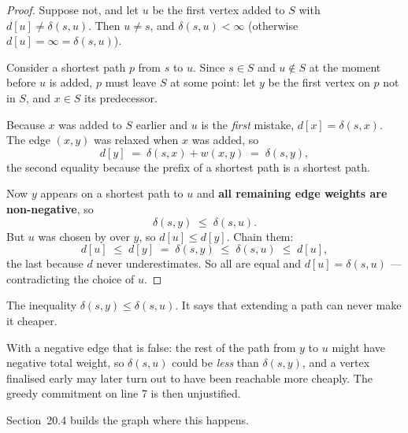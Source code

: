 \begin{proof}
Suppose not, and let $u$ be the first vertex added to $S$ with
$d[u] \ne \delta(s,u)$. Then $u \ne s$, and $\delta(s,u) < \infty$ (otherwise
$d[u] = \infty = \delta(s,u)$).

\smallskip
Consider a shortest path $p$ from $s$ to $u$. Since $s \in S$ and $u \notin S$
at the moment before $u$ is added, $p$ must leave $S$ at some point: let $y$ be
the first vertex on $p$ not in $S$, and $x \in S$ its predecessor.

\smallskip
Because $x$ was added to $S$ earlier and $u$ is the \emph{first} mistake,
$d[x] = \delta(s,x)$. The edge $(x,y)$ was relaxed when $x$ was added, so
\[ d[y] \;=\; \delta(s,x) + w(x,y) \;=\; \delta(s,y), \]
the second equality because the prefix of a shortest path is a shortest path.

\smallskip
Now $y$ appears on a shortest path to $u$ and \textbf{all remaining edge
weights are non-negative}, so
\[ \delta(s,y) \;\le\; \delta(s,u). \]
But $u$ was chosen by  over $y$, so $d[u] \le d[y]$. Chain
them:
\[ d[u] \;\le\; d[y] \;=\; \delta(s,y) \;\le\; \delta(s,u) \;\le\; d[u], \]
the last because $d$ never underestimates. So all are equal and
$d[u] = \delta(s,u)$ --- contradicting the choice of $u$.
\end{proof}

\begin{alertbox}
The inequality $\delta(s,y) \le \delta(s,u)$. It says that extending a path can
never make it cheaper.

\smallskip
With a negative edge that is false: the rest of the path from $y$ to $u$ might
have negative total weight, so $\delta(s,u)$ could be \emph{less} than
$\delta(s,y)$, and a vertex finalised early may later turn out to have been
reachable more cheaply. The greedy commitment on line 7 is then unjustified.

\smallskip
Section~20.4 builds the graph where this happens.
\end{alertbox}

